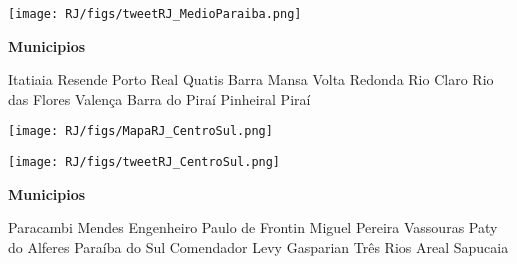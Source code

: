 \documentclass[10pt]{article} %
\begin{document}
\begin{minipage}[t]{.66\linewidth}
\begin{center}
\texttt{[image: RJ/figs/tweetRJ\_MedioParaiba.png]}\end{center}
\end{minipage}\hfill\begin{minipage}[t]{.30\linewidth}
\begin{mdframed}[style=sidebar,frametitle={}]
\textbf{Municipios}\begin{itemize}\wsquare Itatiaia 
\rgsquare Resende 
\wsquare Porto Real 
\wsquare Quatis 
\osquare Barra Mansa 
\ysquare Volta Redonda 
\wsquare Rio Claro 
\wsquare Rio das Flores 
\ysquare Valença 
\wsquare Barra do Piraí 
\gsquare Pinheiral 
\rgsquare Piraí 
\end{itemize}\BackToContents\end{mdframed}\hfill\end{minipage}\newpage\begin{minipage}[t]{.66\linewidth}
\hypertarget{CntS}{}
\texttt{[image: RJ/figs/MapaRJ\_CentroSul.png]}\vspace{0.5cm}\begin{center}

\end{center}
\vspace{0.5cm}\begin{center}
\texttt{[image: RJ/figs/tweetRJ\_CentroSul.png]}\end{center}
\end{minipage}\hfill\begin{minipage}[t]{.30\linewidth}
\begin{mdframed}[style=sidebar,frametitle={}]
\textbf{Municipios}\begin{itemize}\wsquare Paracambi 
\wsquare Mendes 
\ysquare Engenheiro Paulo de Frontin 
\wsquare Miguel Pereira 
\ysquare Vassouras 
\wsquare Paty do Alferes 
\wsquare Paraíba do Sul 
\ysquare Comendador Levy Gasparian 
\osquare Três Rios 
\wsquare Areal 
\wsquare Sapucaia 
\end{itemize}\BackToContents\end{mdframed}\hfill\end{minipage}\newpage\begin{minipage}[t]{.66\linewidth}

\end{minipage}
\end{document}
